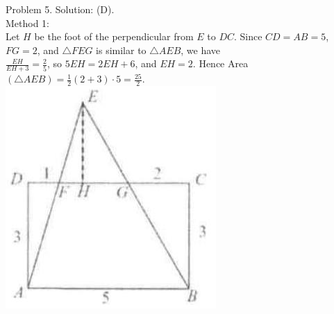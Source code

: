 \documentclass[10pt]{article}
\begin{document}
Problem 5. Solution: (D).\\
Method 1:\\
Let \(H\) be the foot of the perpendicular from \(E\) to \(D C\). Since \(C D=A B=5\), \(F G=2\), and \(\triangle F E G\) is similar to \(\triangle A E B\), we have\\
\(\frac{E H}{E H+3}=\frac{2}{5}\), so \(5 E H=2 E H+6\), and \(E H=2\). Hence Area \((\triangle A E B)=\frac{1}{2}(2+3) \cdot 5=\frac{25}{2}\).\\
\includegraphics[max width=\textwidth, center]{2025_04_17_97bc1f7e44d93c271a88g-093}
\end{document}
